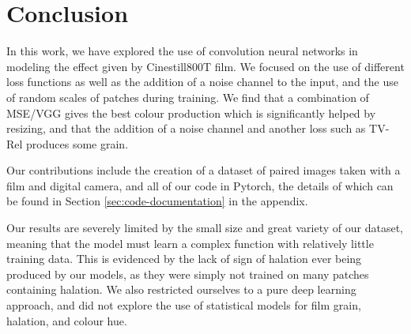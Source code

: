 \section{Conclusion}
\label{sec:conclusion}



In this work, we have explored the use of convolution neural networks in modeling the effect given by Cinestill800T film. We focused on the use of different loss functions as well as the addition of a noise channel to the input, and the use of random scales of patches during training. We find that a combination of MSE/VGG gives the best colour production which is significantly helped by resizing, and that the addition of a noise channel and another loss such as TV-Rel produces some grain.

Our contributions include the creation of a dataset of paired images taken with a film and digital camera, and all of our code in Pytorch, the details of which can be found in Section \ref{sec:code-documentation} in the appendix.


Our results are severely limited by the small size and great variety of our dataset, meaning that the model must learn a complex function with relatively little training data. This is evidenced by the lack of sign of halation ever being produced by our models, as they were simply not trained on many patches containing halation. We also restricted ourselves to a pure deep learning approach, and did not explore the use of statistical models for film grain, halation, and colour hue.



